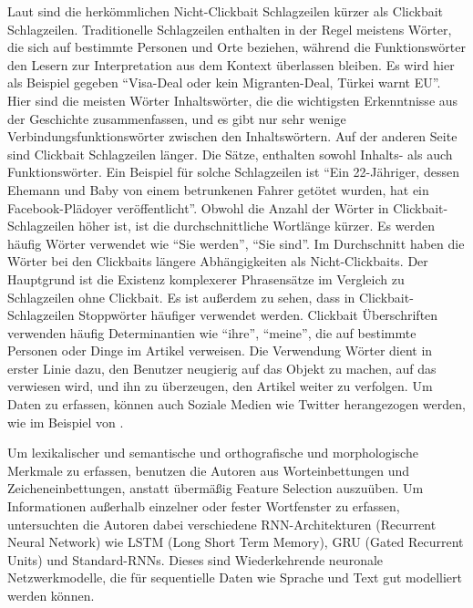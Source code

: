 Laut \cite*{Chakrabortya} sind die herkömmlichen Nicht-Clickbait Schlagzeilen kürzer als Clickbait Schlagzeilen. Traditionelle Schlagzeilen enthalten in der Regel meistens Wörter, die sich auf bestimmte Personen und Orte beziehen, während die Funktionswörter den Lesern zur Interpretation aus dem Kontext überlassen bleiben. Es wird hier als Beispiel gegeben \enquote{Visa-Deal oder kein Migranten-Deal, Türkei warnt EU}. Hier sind die meisten Wörter Inhaltswörter, die die wichtigsten Erkenntnisse aus der Geschichte zusammenfassen, und es gibt nur sehr wenige Verbindungsfunktionswörter zwischen den Inhaltswörtern. Auf der anderen Seite sind Clickbait Schlagzeilen länger. Die Sätze, enthalten sowohl Inhalts- als auch Funktionswörter. Ein Beispiel für solche Schlagzeilen ist \enquote{Ein 22-Jähriger, dessen Ehemann und Baby von einem betrunkenen Fahrer getötet wurden, hat ein Facebook-Plädoyer veröffentlicht}. Obwohl die Anzahl der Wörter in Clickbait-Schlagzeilen höher ist, ist die durchschnittliche Wortlänge kürzer. Es werden häufig Wörter verwendet wie \enquote{Sie werden}, \enquote{Sie sind}. Im Durchschnitt haben die Wörter bei den Clickbaits längere Abhängigkeiten als Nicht-Clickbaits. Der Hauptgrund ist die Existenz komplexerer Phrasensätze im Vergleich zu Schlagzeilen ohne Clickbait. Es ist außerdem zu sehen, dass in Clickbait-Schlagzeilen Stoppwörter häufiger verwendet werden. Clickbait Überschriften verwenden häufig Determinantien wie \enquote{ihre}, \enquote{meine}, die auf bestimmte Personen oder Dinge im Artikel verweisen. Die Verwendung Wörter dient in erster Linie dazu, den Benutzer neugierig auf das Objekt zu machen, auf das verwiesen wird, und ihn zu überzeugen, den Artikel weiter zu verfolgen. Um Daten zu erfassen, können auch Soziale Medien wie Twitter herangezogen werden, wie im Beispiel von \cite*{Potthast}.


Um lexikalischer und semantische und orthografische und morphologische Merkmale zu erfassen, benutzen die Autoren aus \cite*{Anand2019} Worteinbettungen und Zeicheneinbettungen, anstatt übermäßig Feature Selection auszuüben. Um Informationen außerhalb einzelner oder fester Wortfenster zu erfassen, untersuchten die Autoren dabei verschiedene RNN-Architekturen (Recurrent Neural Network) wie LSTM (Long Short Term Memory), GRU (Gated Recurrent Units) und Standard-RNNs. Dieses sind Wiederkehrende neuronale Netzwerkmodelle, die für sequentielle Daten wie Sprache und Text gut modelliert werden können.


